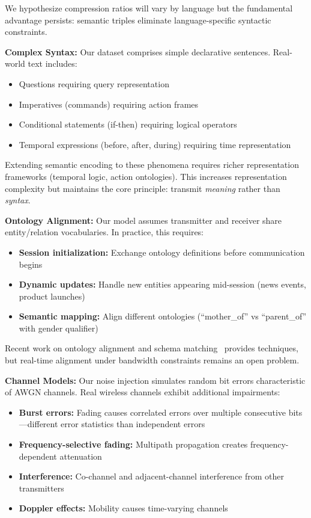 \documentclass[conference]{IEEEtran}
\begin{document}
We hypothesize compression ratios will vary by language but the fundamental 
advantage persists: semantic triples eliminate language-specific syntactic 
constraints.

\textbf{Complex Syntax:} Our dataset comprises simple declarative sentences. 
Real-world text includes:

\begin{itemize}
\item Questions requiring query representation
\item Imperatives (commands) requiring action frames
\item Conditional statements (if-then) requiring logical operators
\item Temporal expressions (before, after, during) requiring time representation
\end{itemize}

Extending semantic encoding to these phenomena requires richer representation 
frameworks (temporal logic, action ontologies). This increases representation 
complexity but maintains the core principle: transmit \textit{meaning} 
rather than \textit{syntax}.

\textbf{Ontology Alignment:} Our model assumes transmitter and receiver 
share entity/relation vocabularies. In practice, this requires:

\begin{itemize}
\item \textbf{Session initialization:} Exchange ontology definitions before 
      communication begins
\item \textbf{Dynamic updates:} Handle new entities appearing mid-session 
      (news events, product launches)
\item \textbf{Semantic mapping:} Align different ontologies (``mother\_of'' 
      vs ``parent\_of'' with gender qualifier)
\end{itemize}

Recent work on ontology alignment and schema matching~\cite{Euzenat2013} 
provides techniques, but real-time alignment under bandwidth constraints 
remains an open problem.

\textbf{Channel Models:} Our noise injection simulates random bit errors 
characteristic of AWGN channels. Real wireless channels exhibit additional 
impairments:

\begin{itemize}
\item \textbf{Burst errors:} Fading causes correlated errors over multiple 
      consecutive bits—different error statistics than independent errors
\item \textbf{Frequency-selective fading:} Multipath propagation creates 
      frequency-dependent attenuation
\item \textbf{Interference:} Co-channel and adjacent-channel interference 
      from other transmitters
\item \textbf{Doppler effects:} Mobility causes time-varying channels
\end{itemize}
\end{document}
